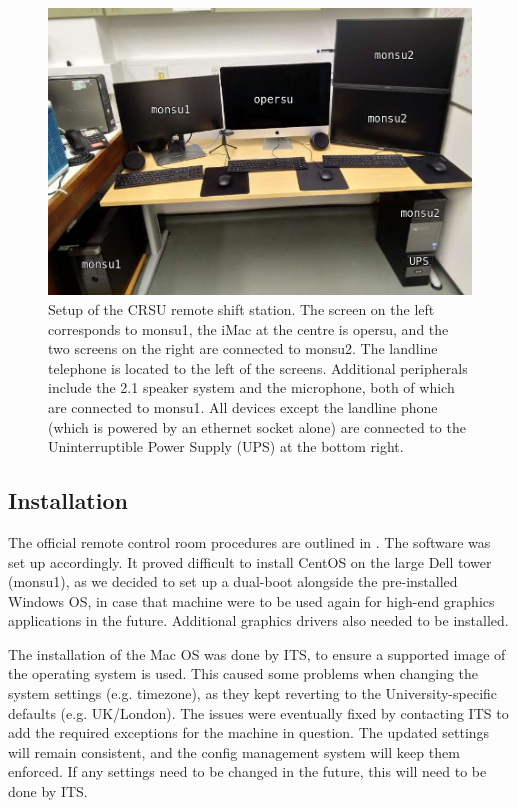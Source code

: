 \documentclass[a4paper,10pt]{article}
\begin{document}
\begin{figure}[htp]
	\includegraphics[width=\textwidth]{images/CRSU_final}
	\caption{Setup of the CRSU remote shift station. The screen on the left corresponds to monsu1, the iMac at the centre is opersu, and the two screens on the right are connected to monsu2. The landline telephone is located to the left of the screens. Additional peripherals include the 2.1 speaker system and the microphone, both of which are connected to monsu1. All devices except the landline phone (which is powered by an ethernet socket alone) are connected to the Uninterruptible Power Supply (UPS) at the bottom right.}
	\label{crsu_setup}
\end{figure}

\subsection{Installation}
The official remote control room procedures are outlined in \cite{doc4776}. The software was set up accordingly. It proved difficult to install CentOS on the large Dell tower (monsu1), as we decided to set up a dual-boot alongside the pre-installed Windows OS, in case that machine were to be used again for high-end graphics applications in the future. Additional graphics drivers also needed to be installed.

The installation of the Mac OS was done by ITS, to ensure a supported image of the operating system is used. This caused some problems when changing the system settings (e.g. timezone), as they kept reverting to the University-specific defaults (e.g. UK/London). The issues were eventually fixed by contacting ITS to add the required exceptions for the machine in question. The updated settings will remain consistent, and the config management system will keep them enforced. If any settings need to be changed in the future, this will need to be done by ITS.
\end{document}
